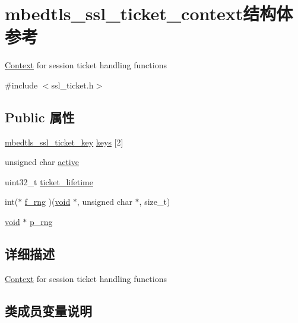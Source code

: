 \hypertarget{structmbedtls__ssl__ticket__context}{}\section{mbedtls\+\_\+ssl\+\_\+ticket\+\_\+context结构体 参考}
\label{structmbedtls__ssl__ticket__context}


\hyperlink{struct_context}{Context} for session ticket handling functions  




{\ttfamily \#include $<$ssl\+\_\+ticket.\+h$>$}

\subsection*{Public 属性}
\begin{DoxyCompactItemize}
\item 
\hyperlink{structmbedtls__ssl__ticket__key}{mbedtls\+\_\+ssl\+\_\+ticket\+\_\+key} \hyperlink{structmbedtls__ssl__ticket__context_a92f8b74506a299795117cf0b60504442}{keys} \mbox{[}2\mbox{]}
\item 
unsigned char \hyperlink{structmbedtls__ssl__ticket__context_aed5bcb363146b9498dd1345e5c141044}{active}
\item 
uint32\+\_\+t \hyperlink{structmbedtls__ssl__ticket__context_ae2548112f1ab8d5ceb7752a205ce358c}{ticket\+\_\+lifetime}
\item 
int($\ast$ \hyperlink{structmbedtls__ssl__ticket__context_a160abf782f580574b39d1e9e31a441e8}{f\+\_\+rng} )(\hyperlink{interfacevoid}{void} $\ast$, unsigned char $\ast$, size\+\_\+t)
\item 
\hyperlink{interfacevoid}{void} $\ast$ \hyperlink{structmbedtls__ssl__ticket__context_a304d8f181d24a4ddbe5b7f0052229b9c}{p\+\_\+rng}
\end{DoxyCompactItemize}


\subsection{详细描述}
\hyperlink{struct_context}{Context} for session ticket handling functions 

\subsection{类成员变量说明}
\mbox{\label{structmbedtls__ssl__ticket__context_aed5bcb363146b9498dd1345e5c141044}} 
